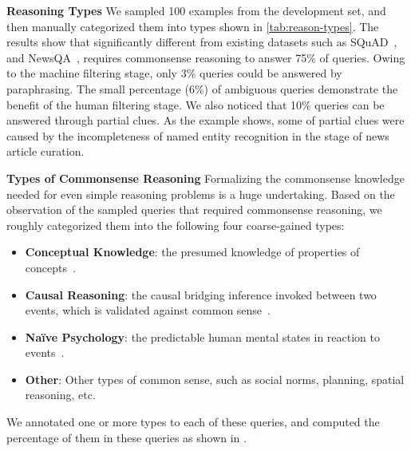 \noindent\textbf{Reasoning Types} We sampled 100 examples from the development set, and then manually categorized them into types shown in \cref{tab:reason-types}.
The results show that significantly different from existing datasets such as SQuAD~\cite{squad}, and NewsQA~\cite{newsqa}, \ReCoRD requires commonsense reasoning to answer 75\% of queries.
Owing to the machine filtering stage, only 3\% queries could be answered by paraphrasing.  
The small percentage (6\%) of ambiguous queries demonstrate the benefit of the human filtering stage.
We also noticed that 10\% queries can be answered through partial clues.
As the example shows, some of partial clues were caused by the incompleteness of named entity recognition in the stage of news article curation.

\noindent\textbf{Types of Commonsense Reasoning} 
Formalizing the commonsense knowledge needed for even simple reasoning problems is a huge undertaking.
Based on the observation of the sampled queries that required commonsense reasoning, we roughly categorized them into the following four coarse-gained types:

\begin{itemize}[itemsep=1pt,topsep=1pt,leftmargin=8pt]
    \item[]\textbf{Conceptual Knowledge}: the presumed knowledge of properties of concepts~\cite{wordnet,conceptnet,class-attributes,joci}.
    \item[]\textbf{Causal Reasoning}: the causal bridging inference invoked between two events, which is validated against common sense~\cite{bridging-inference,copa}. 
    \item[]\textbf{Na\"ive Psychology}: the predictable human mental states in reaction to events~\cite{naive-psychology}.
    \item[]\textbf{Other}: Other types of common sense, such as social norms, planning, spatial reasoning, etc.
\end{itemize}

We annotated one or more types to each of these queries, and computed the percentage of them in these queries as shown in .

